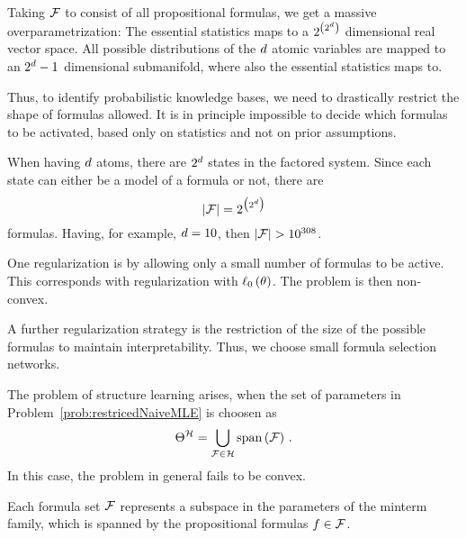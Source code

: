 \begin{remark}[Overparametrization]
	Taking $\mathcal{F}$ to consist of all propositional formulas, we get a massive overparametrization:
	The essential statistics maps to a $2^{\left(2^d \right)}$ dimensional real vector space.
	All possible distributions of the $d$ atomic variables are mapped to an $2^d-1$ dimensional submanifold, where also the essential statistics maps to.

	Thus, to identify probabilistic knowledge bases, we need to drastically restrict the shape of formulas allowed.
	It is in principle impossible to decide which formulas to be activated, based only on statistics and not on prior assumptions.

	When having $d$ atoms, there are $2^{d}$ states in the factored system.
	Since each state can either be a model of a formula or not, there are
		\[ \left|\mathcal{F}\right| = 2^{\big(2^d \big)} \]
	formulas.
	Having, for example, $d=10$, then $\cardof{\formulaset}>10^{308}$.


	One regularization is by allowing only a small number of formulas to be active.
	This corresponds with regularization with $\ell_0\left(\theta\right)$.
	The problem is then non-convex.


	A further regularization strategy is the restriction of the size of the possible formulas to maintain interpretability.
	Thus, we choose small formula selection networks.
\end{remark}





The problem of structure learning arises, when the set of parameters in Problem~\ref{prob:restricedNaiveMLE} is choosen as
	\[ \Theta^{\mathcal{H}}= \bigcup_{\mathcal{F}\in\mathcal{H}} \mathrm{span}\left(\mathcal{F}\right) \, .  \] %
In this case, the problem in general fails to be convex.

Each formula set $\mathcal{F}$ represents a subspace in the parameters of the minterm family, which is spanned by the propositional formulas $f\in\mathcal{F}$.








